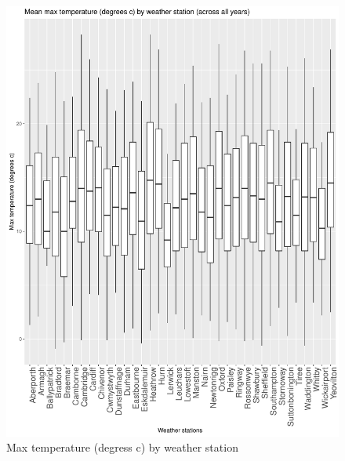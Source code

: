 \documentclass[12pt, oneside, openany]{book}
\begin{document}
\begin{figure}
	\centering
	\captionsetup{justification=centering}
	\includegraphics[scale=0.7]{question_1_010_eda_charts_box_whisker_max_temp}
	\caption{Max temperature (degress c) by weather station}
	\label{fig:question_1_010_eda_charts_box_whisker_max_temp}
\end{figure}
\end{document}
